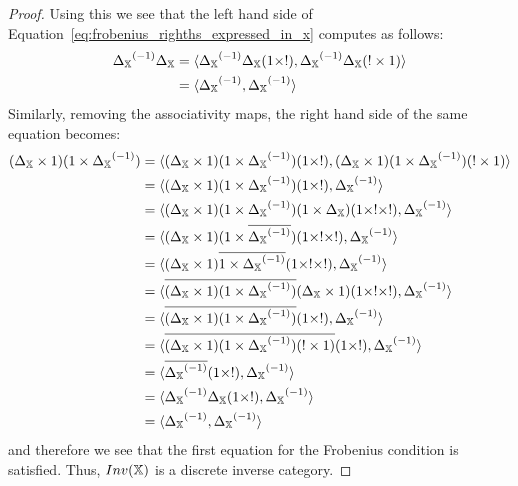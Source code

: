 \begin{proof}
  Using this we see that the left hand side of Equation~\eqref{eq:frobenius_righths_expressed_in_x}
  computes as follows:
  \begin{align*}
    {\Delta_{\ensuremath{\mathbb{X}}}}^{(-1)} \Delta_{\mathbb{X}}
      & = \langle{\Delta_{\ensuremath{\mathbb{X}}}}^{(-1)} \Delta_{\mathbb{X}}(1\times !), {\Delta_{\mathbb{X}}}^{(-1)} \Delta_{\mathbb{X}} (! \times 1)\rangle\\
    &= \langle{\Delta_{\ensuremath{\mathbb{X}}}}^{(-1)}, {\Delta_{\mathbb{X}}}^{(-1)} \rangle
  \end{align*}
  Similarly, removing the associativity maps, the right hand side of the same equation becomes:
  \begin{align*}
    (\Delta_{\X} \times 1) (1\times\inv{\Delta_{\X}}) &
      = \<(\Delta_{\X} \times 1) (1\times\inv{\Delta_{\X}}) (1\times !),
      (\Delta_{\X} \times 1) (1\times\inv{\Delta_{\X}}) (! \times 1 )\> \\
    &= \<(\Delta_{\X} \times 1) (1\times\inv{\Delta_{\X}}) (1\times ! ), \inv{\Delta_{\X}}\> \\
    &= \<(\Delta_{\X} \times 1) (1\times\inv{\Delta_{\X}}) (1 \times \Delta_{\X})(1\times !\times !), \inv{\Delta_{\X}}\> \\
    &= \<(\Delta_{\X} \times 1) (1\times\rst{\inv{\Delta_{\X}}}) (1\times !\times !), \inv{\Delta_{\X}}\> \\
    &= \<(\Delta_{\X} \times 1) \rst{1\times\inv{\Delta_{\X}}} (1\times !\times !), \inv{\Delta_{\X}}\> \\
    &= \<\rst{(\Delta_{\X} \times 1) (1\times\inv{\Delta_{\X}})}
      (\Delta_{\X} \times 1)(1\times !\times !), \inv{\Delta_{\X}}\> \\ %
    &= \<\rst{(\Delta_{\X} \times 1) (1\times\inv{\Delta_{\X}})} (1\times !), \inv{\Delta_{\X}}\> \\
      &= \<\rst{(\Delta_{\X} \times 1) (1\times\inv{\Delta_{\X}})(! \times 1)} (1\times !),
      \inv{\Delta_{\X}}\> \\ %
    &= \<\rst{\inv{\Delta_{\X}}} (1\times !), \inv{\Delta_{\X}}\> \\
    &= \<\inv{\Delta_{\X}}\Delta_{\X}(1\times !), \inv{\Delta_{\X}}\> \\
    &= \<\inv{\Delta_{\X}}, \inv{\Delta_{\X}}\>
  \end{align*}
  and therefore we see that the first equation for the Frobenius condition is satisfied. Thus,
  $Inv(\mathbb{X})$ is a discrete inverse category.
\end{proof}


